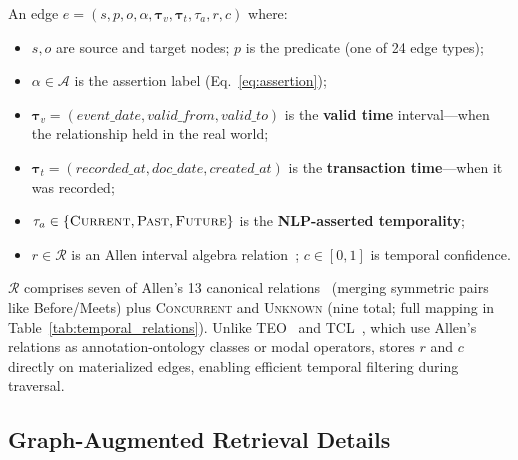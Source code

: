 \begin{definition}
\label{def:edge}
An edge $e = (s, p, o, \alpha, \boldsymbol{\tau}_v, \boldsymbol{\tau}_t, \tau_a, r, c)$ where:
\begin{itemize}[nosep,leftmargin=1.5em]
  \item $s, o$ are source and target nodes; $p$ is the predicate (one of 24 edge types);
  \item $\alpha \in \mathcal{A}$ is the assertion label (Eq.~\ref{eq:assertion});
  \item $\boldsymbol{\tau}_v = (\textit{event\_date}, \textit{valid\_from}, \textit{valid\_to})$ is the \textbf{valid time} interval---when the relationship held in the real world;
  \item $\boldsymbol{\tau}_t = (\textit{recorded\_at}, \textit{doc\_date}, \textit{created\_at})$ is the \textbf{transaction time}---when it was recorded;
  \item $\tau_a \in \{\textnormal{\textsc{Current}}, \textnormal{\textsc{Past}}, \textnormal{\textsc{Future}}\}$ is the \textbf{NLP-asserted temporality};
  \item $r \in \mathcal{R}$ is an Allen interval algebra relation~\cite{allen1983temporal}; $c \in [0,1]$ is temporal confidence.
\end{itemize}
\end{definition}

$\mathcal{R}$ comprises seven of Allen's 13 canonical relations~\cite{allen1983temporal} (merging symmetric pairs like Before/Meets) plus \textsc{Concurrent} and \textsc{Unknown} (nine total; full mapping in Table~\ref{tab:temporal_relations}).
Unlike TEO~\cite{li2020teo} and TCL~\cite{ong2023tcl}, which use Allen's relations as annotation-ontology classes or modal operators, \epikg stores $r$ and $c$ directly on materialized edges, enabling efficient temporal filtering during traversal.

\subsection{Graph-Augmented Retrieval Details}
\label{app:retrieval_details}


